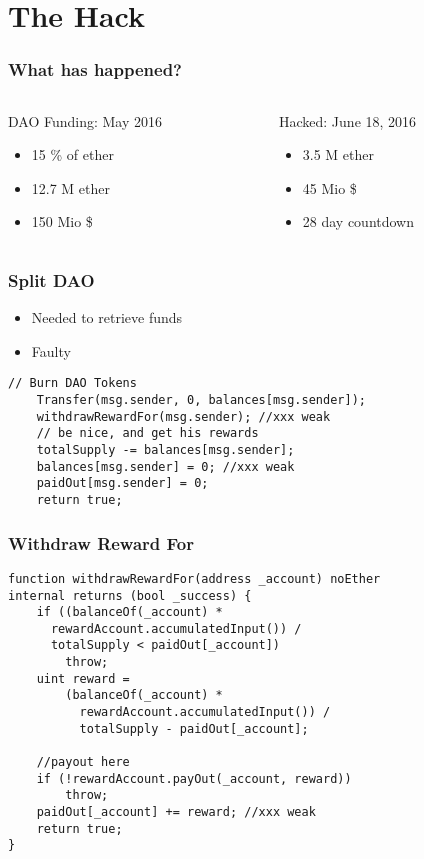 \documentclass{beamer}
\begin{document}
\section{The Hack}


\begin{frame}[fragile]
  \frametitle{What has happened?}
  \begin{columns}
    \begin{column}{0.5\textwidth}
      DAO Funding: May 2016
      \begin{itemize}
        \item 15 \% of ether
        \item 12.7 M ether
        \item 150 Mio \$
      \end{itemize}
    \end{column}
    \pause
    \begin{column}{0.5\textwidth}
      Hacked: June 18, 2016
      \begin{itemize}
        \item 3.5 M ether
        \item 45 Mio \$
        \item 28 day countdown
      \end{itemize}
    \end{column}
  \end{columns}
\end{frame}

\begin{frame}[fragile]
  \frametitle{Split DAO}
  \begin{itemize}
    \item Needed to retrieve funds
    \item Faulty
  \end{itemize}
  \begin{lstlisting}[language=Solidity]
    // Burn DAO Tokens
    Transfer(msg.sender, 0, balances[msg.sender]);
    withdrawRewardFor(msg.sender); //xxx weak
    // be nice, and get his rewards
    totalSupply -= balances[msg.sender];
    balances[msg.sender] = 0; //xxx weak
    paidOut[msg.sender] = 0;
    return true;
  \end{lstlisting}
\end{frame}

\begin{frame}[fragile]
  \frametitle{Withdraw Reward For}
  \begin{lstlisting}[language=Solidity]
function withdrawRewardFor(address _account) noEther 
internal returns (bool _success) {
    if ((balanceOf(_account) * 
      rewardAccount.accumulatedInput()) /
      totalSupply < paidOut[_account])
        throw;
    uint reward =
        (balanceOf(_account) * 
          rewardAccount.accumulatedInput()) /
          totalSupply - paidOut[_account];
    
    //payout here
    if (!rewardAccount.payOut(_account, reward)) 
        throw;
    paidOut[_account] += reward; //xxx weak
    return true;
}
  \end{lstlisting}
\end{frame}
\end{document}
